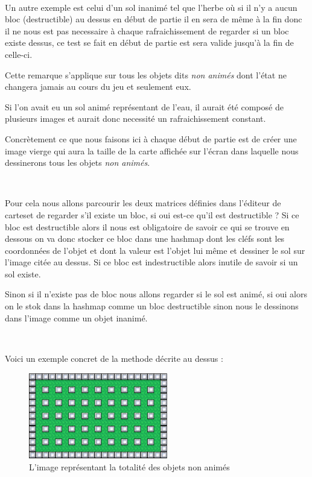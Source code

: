 			$\,$			
			
			Un autre exemple est celui d'un sol inanimé tel que l'herbe où si il n'y a
			aucun bloc (destructible) au dessus en début de partie il en sera de même à
			la fin donc il ne nous est pas necessaire à chaque rafraichissement de
			regarder si un bloc existe dessus, ce test se fait en début de partie est
			sera valide jusqu'à la fin de celle-ci.
			
			
			Cette remarque s'applique sur tous les objets dits \emph{non animés} dont
			l'état ne changera jamais au cours du jeu et seulement eux.
			
			
			Si l'on avait eu un sol animé représentant de l'eau, il aurait été composé de
			plusieurs images et aurait donc necessité un rafraichissement constant.

			
			Concrètement ce que nous faisons ici à chaque début de partie est de créer
			une image vierge qui aura la taille de la carte affichée sur l'écran dans
			laquelle nous dessinerons tous les objets \emph{non animés}.
			
			$\,$
			
			Pour cela nous allons parcourir les deux matrices définies dans l'éditeur de
			cartes\footnotemark[2] et de regarder s'il existe un bloc, si oui est-ce
			qu'il est destructible ? Si ce bloc est destructible alors il nous est
			obligatoire de savoir ce qui se trouve en dessous on va donc stocker ce bloc
			dans une hashmap dont les cléfs sont les coordonnées de l'objet et dont la
			valeur est l'objet lui même et dessiner le sol sur l'image citée au dessus.
			Si ce bloc est indestructible alors inutile de savoir si un sol existe.
			
			Sinon si il n'existe pas de bloc nous allons regarder si le sol est animé, si
			oui alors on le stok dans la hashmap comme un bloc destructible sinon nous le
			dessinons dans l'image comme un objet inanimé.
			
			$\,$
			
			Voici un exemple concret de la methode décrite au dessus :
			

			\begin{figure}[h]			
				\begin{center}			
					\includegraphics[width=229px, height=142px]{Developpement/Img/map.eps}
					\caption{L'image représentant la totalité des objets non animés}
				\end{center}
			\end{figure}

